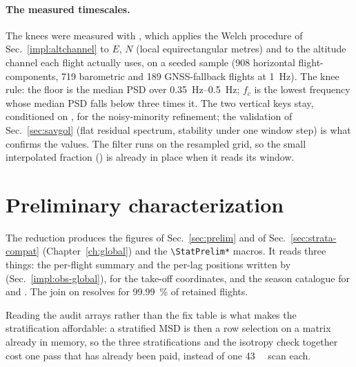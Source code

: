 \paragraph{The measured timescales.} The knees were measured with
, which applies the Welch procedure of
Sec.~\ref{impl:altchannel} to $E$, $N$ (local equirectangular metres) and to the altitude
channel each flight actually uses, on a seeded sample (908 horizontal flight-components,
719 barometric and 189 GNSS-fallback flights at \SI{1}{\hertz}). The knee rule: the floor
is the median PSD over \SIrange{0.35}{0.5}{\hertz}; $f_c$ is the lowest frequency whose
median PSD falls below three times it.  The two vertical keys stay, conditioned on
, for the
noisy-minority refinement; the validation of Sec.~\ref{sec:savgol} (flat residual
spectrum, stability under one window step) is what confirms the values. The filter runs
on the resampled grid, so the small interpolated fraction () is
already in place when it reads its window.

\section{Preliminary characterization}
\label{impl:prelim}
\begin{revblock}
The reduction
 produces the figures of
Sec.~\ref{sec:prelim} and of Sec.~\ref{sec:strata-compat} (Chapter~\ref{ch:global}) and the
\texttt{\textbackslash StatPrelim*} macros. It reads three
things: the per-flight summary and the per-lag positions written by
 (Sec.~\ref{impl:obs-global}),
 for the take-off coordinates,
and the season catalogue for  and . The join on
 resolves for \SI{99.99}{\percent} of retained flights.

Reading the audit arrays rather than the fix table is what makes the stratification
affordable: a stratified MSD is then a row selection on a matrix already in memory, so the
three stratifications and the isotropy check together cost one pass that has already been
paid, instead of one \SI{43}{\giga\byte} scan each.
\end{revblock}

